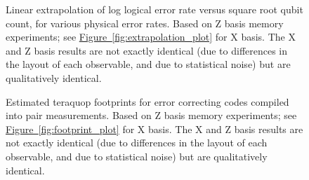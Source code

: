 \documentclass[onecolumn,unpublished,a4paper]{quantumarticle}
\theoremstyle{definition}
\theoremstyle{definition}
\theoremstyle{definition}
\newcommand{\fig}[1]{\hyperref[fig:#1]{Figure~\ref*{fig:#1}}}
\begin{document}
\begin{figure}[h!]
    \centering
    \caption{
        Linear extrapolation of log logical error rate versus square root qubit count, for various physical error rates.
        Based on Z basis memory experiments; see \fig{extrapolation_plot} for X basis.
        The X and Z basis results are not exactly identical (due to differences in the layout of each observable, and due to statistical noise) but are qualitatively identical.
    }
    \label{fig:extrapolation_plot_other_z}
\end{figure}

\begin{figure}
    \centering
    \caption{
        Estimated teraquop footprints for error correcting codes compiled into pair measurements.
        Based on Z basis memory experiments; see \fig{footprint_plot} for X basis.
        The X and Z basis results are not exactly identical (due to differences in the layout of each observable, and due to statistical noise) but are qualitatively identical.
    }
    \label{fig:footprint_plot_z}
\end{figure}
\end{document}
